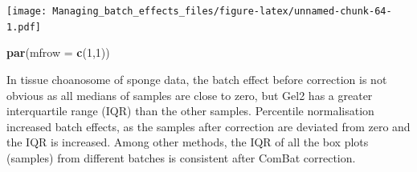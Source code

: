 \documentclass[]{book}
\newenvironment{Shaded}{\begin{snugshade}}{\end{snugshade}}
\newcommand{\KeywordTok}[1]{\textcolor[rgb]{0.13,0.29,0.53}{\textbf{#1}}}
\newcommand{\DataTypeTok}[1]{\textcolor[rgb]{0.13,0.29,0.53}{#1}}
\newcommand{\DecValTok}[1]{\textcolor[rgb]{0.00,0.00,0.81}{#1}}
\newcommand{\NormalTok}[1]{#1}
\begin{document}
\texttt{[image: Managing\_batch\_effects\_files/figure-latex/unnamed-chunk-64-1.pdf]}

\begin{Shaded}
\begin{Highlighting}[]
\KeywordTok{par}\NormalTok{(}\DataTypeTok{mfrow =} \KeywordTok{c}\NormalTok{(}\DecValTok{1}\NormalTok{,}\DecValTok{1}\NormalTok{))}
\end{Highlighting}
\end{Shaded}

In tissue choanosome of sponge data, the batch effect before correction
is not obvious as all medians of samples are close to zero, but Gel2 has
a greater interquartile range (IQR) than the other samples. Percentile
normalisation increased batch effects, as the samples after correction
are deviated from zero and the IQR is increased. Among other methods,
the IQR of all the box plots (samples) from different batches is
consistent after ComBat correction.
\end{document}
